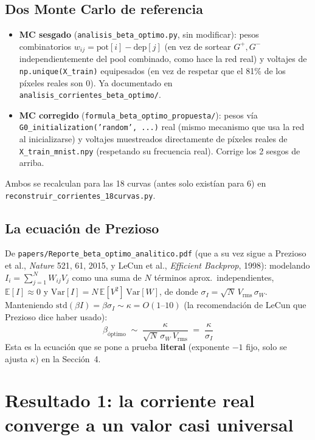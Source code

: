 \documentclass[11pt]{article}
\begin{document}
\subsection{Dos Monte Carlo de referencia}

\begin{itemize}
\item \textbf{MC sesgado} (\texttt{analisis\_beta\_optimo.py}, sin
  modificar): pesos combinatorios $w_{ij}=\mathrm{pot}[i]-\mathrm{dep}[j]$
  (en vez de sortear $G^+,G^-$ independientemente del pool combinado, como
  hace la red real) y voltajes de \texttt{np.unique(X\_train)} equipesados
  (en vez de respetar que el 81\% de los píxeles reales son 0). Ya
  documentado en \texttt{analisis\_corrientes\_beta\_optimo/}.
\item \textbf{MC corregido} (\texttt{formula\_beta\_optimo\_propuesta/}):
  pesos vía \texttt{G0\_initialization('random', ...)} real (mismo
  mecanismo que usa la red al inicializarse) y voltajes muestreados
  directamente de píxeles reales de \texttt{X\_train\_mnist.npy}
  (respetando su frecuencia real). Corrige los 2 sesgos de arriba.
\end{itemize}

Ambos se recalculan para las 18 curvas (antes solo existían para 6) en
\texttt{reconstruir\_corrientes\_18curvas.py}.

\subsection{La ecuación de Prezioso}

De \texttt{papers/Reporte\_beta\_optimo\_analitico.pdf} (que a su vez sigue
a Prezioso et al., \emph{Nature} 521, 61, 2015, y LeCun et al.,
\emph{Efficient Backprop}, 1998): modelando $I_i=\sum_{j=1}^N W_{ij}V_j$
como una suma de $N$ términos aprox.\ independientes,
$\mathbb{E}[I]\approx0$ y $\mathrm{Var}[I]=N\,\mathbb{E}[V^2]\,\mathrm{Var}[W]$,
de donde $\sigma_I=\sqrt{N}\,V_{\mathrm{rms}}\,\sigma_W$. Manteniendo
$\mathrm{std}(\beta I)=\beta\sigma_I\sim\kappa=O(1\text{--}10)$ (la
recomendación de LeCun que Prezioso dice haber usado):
\begin{equation}
\beta_{\text{óptimo}} \;\sim\; \frac{\kappa}{\sqrt{N}\,\sigma_W\,V_{\mathrm{rms}}} \;=\; \frac{\kappa}{\sigma_I}
\label{eq:prezioso}
\end{equation}
Esta es la ecuación que se pone a prueba \textbf{literal} (exponente $-1$
fijo, solo se ajusta $\kappa$) en la Sección~4.

\section{Resultado 1: la corriente real converge a un valor casi universal}
\end{document}
